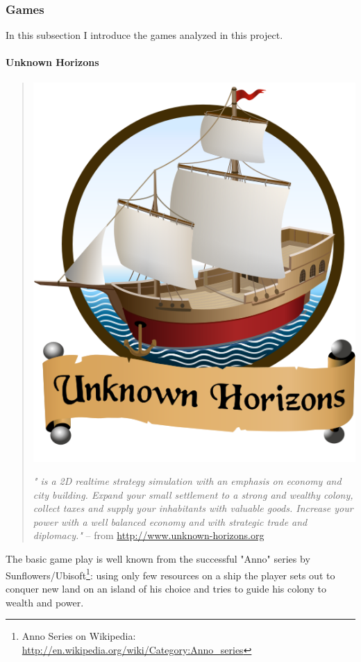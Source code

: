 \subsubsection{Games}
In this subsection I introduce the games analyzed in this project.

\paragraph{Unknown Horizons}
\begin{quote}
\begin{center}\includegraphics[scale=0.2]{pics/uhlogo}\end{center}
\textit{"\UH{} is a 2D realtime strategy simulation with an emphasis on economy and city building. Expand your small settlement
to a strong and wealthy colony, collect taxes and supply your inhabitants with valuable goods. Increase your power with
a well balanced economy and with strategic trade and diplomacy."} -- from \url{http://www.unknown-horizons.org}
\end{quote}

The basic game play is well known from the successful "Anno" series by Sunflowers/Ubisoft\footnote{Anno Series on
Wikipedia: \url{http://en.wikipedia.org/wiki/Category:Anno_series}}: using only few resources on a ship the player sets
out to conquer new land on an island of his choice and tries to guide his colony to wealth and power.

